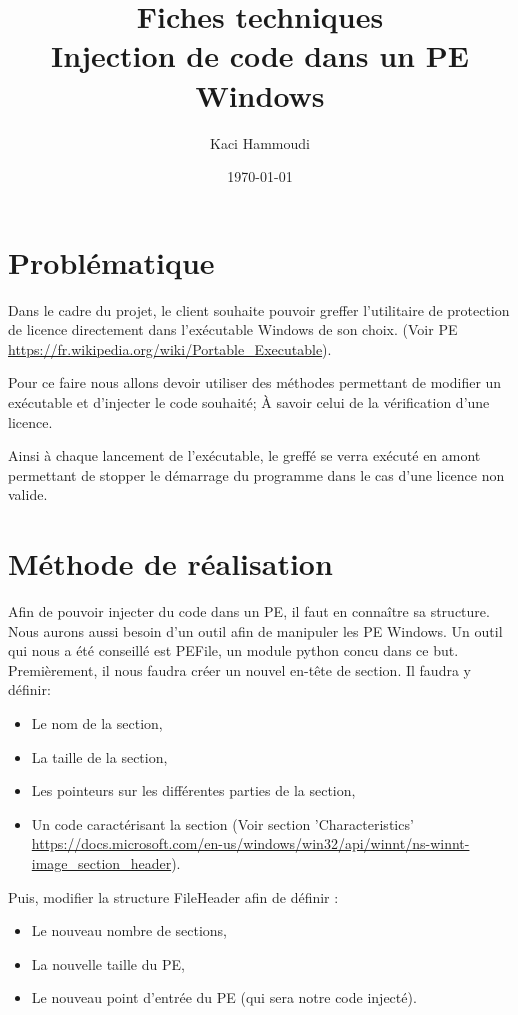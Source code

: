 \documentclass{article}
\title{
    \Huge
    Fiches techniques\\
    Injection de code dans un PE Windows
}
\author{\huge Kaci Hammoudi}
\date{\huge \today}
\begin{document}
\maketitle
\newpage

\section{Problématique}

Dans le cadre du projet, le client souhaite pouvoir greffer l'utilitaire de protection de licence directement dans l'exécutable Windows de son choix. 
(Voir PE \url{https://fr.wikipedia.org/wiki/Portable_Executable}).

Pour ce faire nous allons devoir utiliser des méthodes permettant de modifier un exécutable
et d'injecter le code souhaité; À savoir celui de la vérification d'une licence.

Ainsi à chaque lancement de l'exécutable, le greffé se verra exécuté en amont permettant 
de stopper le démarrage du programme dans le cas d'une licence non valide.

\section{Méthode de réalisation}

Afin de pouvoir injecter du code dans un PE, il faut en connaître sa structure. 
Nous aurons aussi besoin d'un outil afin de manipuler les PE Windows.
Un outil qui nous a été conseillé est PEFile, un module python concu dans ce but.\\

Premièrement, il nous faudra créer un nouvel en-tête de section.
Il faudra y définir: 
\begin{itemize}
    \item Le nom de la section,
    \item La taille de la section,
    \item Les pointeurs sur les différentes parties de la section,
    \item Un code caractérisant la section (Voir section 'Characteristics' \url{https://docs.microsoft.com/en-us/windows/win32/api/winnt/ns-winnt-image_section_header}).
\end{itemize}

Puis, modifier la structure FileHeader afin de définir :
\begin{itemize}
    \item Le nouveau nombre de sections,
    \item La nouvelle taille du PE,
    \item Le nouveau point d'entrée du PE (qui sera notre code injecté).
\end{itemize}
\end{document}
